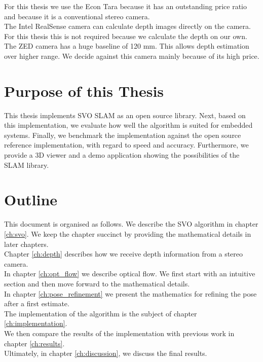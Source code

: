 \documentclass[11pt,a4paper,titlepage,oneside]{report}
\begin{document}
For this thesis we use the Econ Tara because it has an outstanding price ratio and because it is a conventional stereo camera.\\
The Intel RealSense camera can calculate depth images directly on the camera. For this thesis this is not required because we calculate the depth on our own.\\
The ZED camera has a huge baseline of 120 mm. This allows depth estimation over higher range. We decide against this camera mainly because of its high price.

\section{Purpose of this Thesis}

This thesis implements SVO SLAM as an open source library. Next, based on this implementation, we evaluate how well the algorithm is suited for embedded systems. Finally, we benchmark the implementation against the open source reference implementation, with regard to speed and accuracy. Furthermore, we provide a 3D viewer and a demo application showing the possibilities of the SLAM library.

\section{Outline}

This document is organised as follows. We describe the SVO algorithm in chapter \ref{ch:svo}. We keep the chapter succinct by providing the mathematical details in later chapters.\\
Chapter \ref{ch:depth} describes how we receive depth information from a stereo camera.\\
In chapter \ref{ch:opt_flow} we describe optical flow. We first start with an intuitive section and then move forward to the mathematical details.\\
In chapter \ref{ch:pose_refinement} we present the mathematics for refining  the pose after a first estimate.\\
The implementation of the algorithm is the subject of chapter \ref{ch:implementation}.\\
We then compare the results of the implementation with previous work in chapter \ref{ch:results}.\\
Ultimately, in chapter \ref{ch:discussion}, we discuss the final results.
\end{document}
